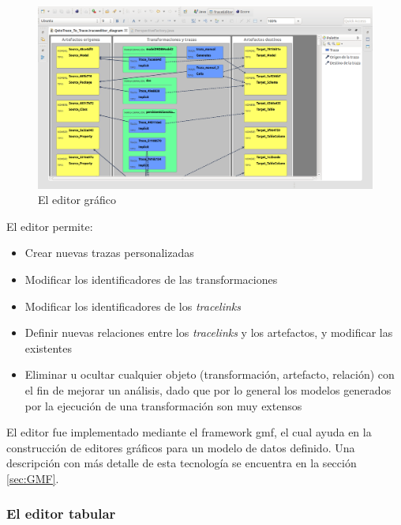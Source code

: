 \documentclass[a4paper,12pt,oneside,spanish]{book}
\begin{document}
\begin{figure}[hbtp]
\centering
\includegraphics[scale=.29]{./img/TraceEditorGrafico}
\caption{El editor gráfico}
\label{fig:TraceEditorGrafico}
\end{figure}


El editor permite:

\begin{itemize}
\item Crear nuevas trazas personalizadas
\item Modificar los identificadores de las transformaciones
\item Modificar los identificadores de los \textit{tracelinks}
\item Definir nuevas relaciones entre los \textit{tracelinks} y los artefactos, y modificar las existentes 
\item Eliminar u ocultar cualquier objeto (transformación, artefacto, relación) con el fin de mejorar un análisis, dado que por lo general los modelos generados por la ejecución de una transformación son muy extensos
\end{itemize}


El editor fue implementado mediante el framework \gls{gmf}, el cual ayuda en la construcción de editores gráficos para un modelo de datos definido. Una descripción con más detalle de esta tecnología se encuentra en la sección \ref{sec:GMF}.


\subsubsection{El editor tabular}
\label{subsubsec:EditorTabular}
\end{document}
